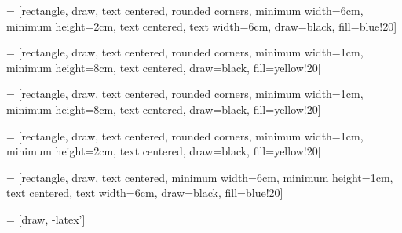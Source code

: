 \documentclass[12pt, a4paper]{article}
\begin{document}
 = [rectangle, draw, text centered, rounded corners, minimum width=6cm, minimum height=2cm, text centered, text width=6cm, draw=black, fill=blue!20]

 = [rectangle, draw, text centered, rounded corners, minimum width=1cm, minimum height=8cm, text centered, draw=black, fill=yellow!20]

 = [rectangle, draw, text centered, rounded corners, minimum width=1cm, minimum height=8cm, text centered, draw=black, fill=yellow!20]

 = [rectangle, draw, text centered, rounded corners, minimum width=1cm, minimum height=2cm, text centered, draw=black, fill=yellow!20]

 = [rectangle, draw, text centered, minimum width=6cm, minimum height=1cm, text centered, text width=6cm, draw=black, fill=blue!20]

 = [draw, -latex']


\renewcommand{\arraystretch}{2}


\clearpage
\tableofcontents
\newpage
\begin{abstract}
\end{abstract}
\clearpage





%

\newpage
\printbibliography
\clearpage

\end{document}
